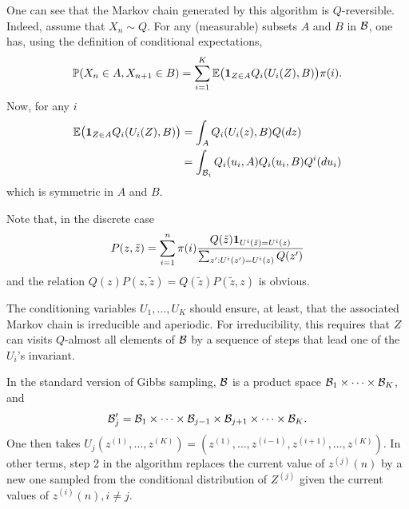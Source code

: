 One can see that the Markov chain generated by this algorithm is $Q$-reversible. Indeed, assume that $X_n\sim Q$. For any (measurable) subsets $A$ and $B$ in ${\mathcal B}$, one has, using the definition of conditional expectations, 
\begin{equation}
\label{eq:gs.theory.1}
\bm{\mathbb P}(X_n\in A, X_{n+1}\in B) = \sum_{i=1}^K \bm{\mathbb E}\big({\bm 1}_{Z\in A} Q_i(U_i(Z), B)\big) \pi(i).
\end{equation}
Now, for any $i$
\begin{align*}
\bm{\mathbb E}\big({\bm 1}_{Z\in A} Q_i(U_i(Z), B)\big) &=
\int_A Q_i(U_i(z), B) Q(dz)\\
&= \int_{{\mathcal B}_i} Q_i(u_i, A) Q_i(u_i, B) Q^i(du_i)
\end{align*}
which is symmetric in $A$ and $B$.

Note that, in the discrete case
\begin{equation}
\label{eq:gs.discrete}
P(z, \tilde z) = \sum_{i=1}^n \pi (i) \frac{Q(\tilde z){\bm 1}_{U^i(\tilde z) = U^i(z)}}{\sum_{z': U^i(z') = U^i(z)} Q(z')}
\end{equation}
and the relation $Q(z) P(z, \tilde z) = Q(\tilde z) P(\tilde z, z)$ is obvious.

The conditioning variables $U_1, \ldots, U_K$ should ensure, at least, that the associated Markov chain is irreducible and aperiodic. For irreducibility, this requires 
that $Z$ can visits $Q$-almost all elements of ${\mathcal B}$ by a sequence of steps that lead one of the $U_i$'s invariant.  


\begin{remark}
\label{rem:gibbs.sampling.1}
In the standard version of Gibbs sampling, ${\mathcal B}$ is a product space ${\mathcal B}_1 \times \cdots \times {\mathcal B}_K$, and
\[
{\mathcal B}'_j = {\mathcal B}_1 \times \cdots \times {\mathcal B}_{j-1} \times {\mathcal B}_{j+1} \times \cdots\times {\mathcal B}_K.
\]
One then takes
$U_j(z^{(1)}, \ldots, z^{(K)}) =  (z^{(1)}, \ldots, z^{(i-1)}, z^{(i+1)}, \ldots, z^{(K)})$. In other terms, step 2 in the algorithm replaces the current value of $z^{(j)}(n)$ by a new one sampled from the conditional distribution of $Z^{(j)}$ given the current values of $z^{(i)}(n), i\neq j$. 
\end{remark}

